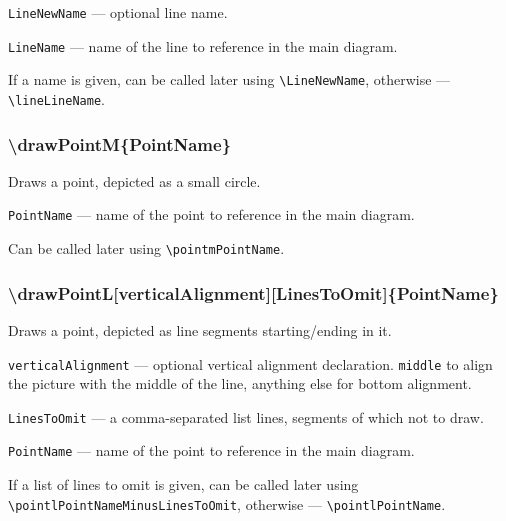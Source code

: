 \documentclass{ltxdoc}
\begin{document}
	\texttt{LineNewName} — optional line name. 
	
	\texttt{LineName} — name of the line to reference in the main diagram. 
	
	If a name is given, can be called later using \texttt{\textbackslash LineNewName}, otherwise — \texttt{\textbackslash lineLineName}. 
	
\subsubsection{\textbackslash drawPointM\{PointName\}}

	Draws a point, depicted as a small circle.
	
	\texttt{PointName} — name of the point to reference in the main diagram. 
	
	Can be called later using \texttt{\textbackslash pointmPointName}. 

\subsubsection{\textbackslash drawPointL[verticalAlignment][LinesToOmit]\{PointName\}}

	Draws a point, depicted as line segments starting/ending in it.

	\texttt{verticalAlignment} — optional vertical alignment declaration. \texttt{middle} to align the picture with the middle of the line, anything else for bottom alignment.
	
	\texttt{LinesToOmit} — a comma-separated list lines, segments of which not to draw. 
	
	\texttt{PointName} — name of the point to reference in the main diagram. 
	
	If a list of lines to omit is given, can be called later using \texttt{\textbackslash pointlPointNameMinusLinesToOmit}, otherwise — \texttt{\textbackslash pointlPointName}. 

\end{document}
